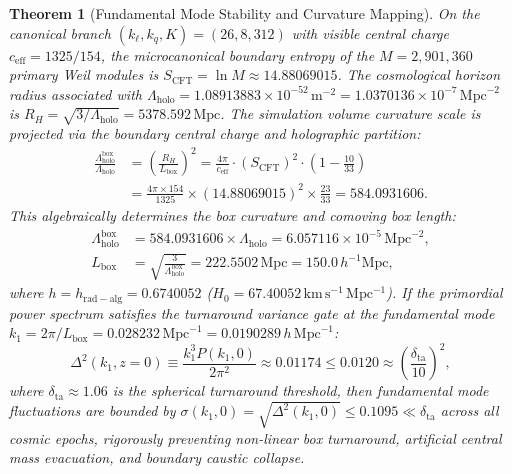 \documentclass[11pt,letterpaper]{article}
\theoremstyle{plain}
\newtheorem{theorem}{Theorem}
\begin{document}
\begin{theorem}[Fundamental Mode Stability and Curvature Mapping]
On the canonical branch $(k_\ell, k_q, K) = (26, 8, 312)$ with visible central charge $c_{\mathrm{eff}} = 1325/154$, the microcanonical boundary entropy of the $M = 2{,}901{,}360$ primary Weil modules is $S_{\mathrm{CFT}} = \ln M \approx 14.88069015$. The cosmological horizon radius associated with $\Lambda_{\mathrm{holo}} = 1.08913883 \times 10^{-52}\,\mathrm{m}^{-2} = 1.0370136 \times 10^{-7}\,\mathrm{Mpc}^{-2}$ is $R_H = \sqrt{3/\Lambda_{\mathrm{holo}}} = 5378.592\,\mathrm{Mpc}$. The simulation volume curvature scale is projected via the boundary central charge and holographic partition:
\begin{equation}
\begin{aligned}
    \frac{\Lambda_{\mathrm{holo}}^{\mathrm{box}}}{\Lambda_{\mathrm{holo}}} &= \left(\frac{R_H}{L_{\mathrm{box}}}\right)^2 = \frac{4\pi}{c_{\mathrm{eff}}} \cdot (S_{\mathrm{CFT}})^2 \cdot \left(1 - \frac{10}{33}\right) \\
    &= \frac{4\pi \times 154}{1325} \times (14.88069015)^2 \times \frac{23}{33} = 584.0931606.
\end{aligned}
\end{equation}
This algebraically determines the box curvature and comoving box length:
\begin{equation}
\begin{aligned}
    \Lambda_{\mathrm{holo}}^{\mathrm{box}} &= 584.0931606 \times \Lambda_{\mathrm{holo}} = 6.057116 \times 10^{-5}\,\mathrm{Mpc}^{-2}, \\
    L_{\mathrm{box}} &= \sqrt{\frac{3}{\Lambda_{\mathrm{holo}}^{\mathrm{box}}}} = 222.5502\,\mathrm{Mpc} = 150.0\,h^{-1}\mathrm{Mpc},
\end{aligned}
\end{equation}
where $h = h_{\mathrm{rad-alg}} = 0.6740052$ ($H_0 = 67.40052\,\mathrm{km\,s^{-1}\,Mpc^{-1}}$).
If the primordial power spectrum satisfies the turnaround variance gate at the fundamental mode $k_1 = 2\pi / L_{\mathrm{box}} = 0.028232\,\mathrm{Mpc}^{-1} = 0.0190289\,h\,\mathrm{Mpc}^{-1}$:
\begin{equation}
    \Delta^2(k_1, z=0) \equiv \frac{k_1^3 P(k_1, 0)}{2\pi^2} \approx 0.01174 \le 0.0120 \approx \left(\frac{\delta_{\mathrm{ta}}}{10}\right)^2,
\end{equation}
where $\delta_{\mathrm{ta}} \approx 1.06$ is the spherical turnaround threshold, then fundamental mode fluctuations are bounded by $\sigma(k_1, 0) = \sqrt{\Delta^2(k_1, 0)} \le 0.1095 \ll \delta_{\mathrm{ta}}$ across all cosmic epochs, rigorously preventing non-linear box turnaround, artificial central mass evacuation, and boundary caustic collapse.
\end{theorem}
\end{document}
